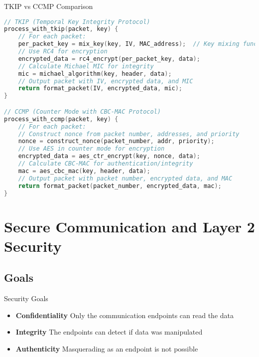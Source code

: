 \begin{examplecode}{TKIP vs CCMP Comparison}\\
\begin{lstlisting}[language=C, style=basesmol]
// TKIP (Temporal Key Integrity Protocol)
process_with_tkip(packet, key) {
    // For each packet:
    per_packet_key = mix_key(key, IV, MAC_address);  // Key mixing function
    // Use RC4 for encryption
    encrypted_data = rc4_encrypt(per_packet_key, data);
    // Calculate Michael MIC for integrity
    mic = michael_algorithm(key, header, data);
    // Output packet with IV, encrypted data, and MIC
    return format_packet(IV, encrypted_data, mic);
}

// CCMP (Counter Mode with CBC-MAC Protocol)
process_with_ccmp(packet, key) {
    // For each packet:
    // Construct nonce from packet number, addresses, and priority
    nonce = construct_nonce(packet_number, addr, priority);
    // Use AES in counter mode for encryption
    encrypted_data = aes_ctr_encrypt(key, nonce, data);
    // Calculate CBC-MAC for authentication/integrity
    mac = aes_cbc_mac(key, header, data);
    // Output packet with packet number, encrypted data, and MAC
    return format_packet(packet_number, encrypted_data, mac);
}
\end{lstlisting}
\end{examplecode}

\section{Secure Communication and Layer 2 Security}

\subsection{Goals}

\begin{definition}{Security Goals}\\
    \begin{itemize}
        \item \textbf{Confidentiality} Only the communication endpoints can read the data
        \item \textbf{Integrity} The endpoints can detect if data was manipulated
        \item \textbf{Authenticity} Masquerading as an endpoint is not possible
    \end{itemize}
\end{definition}

